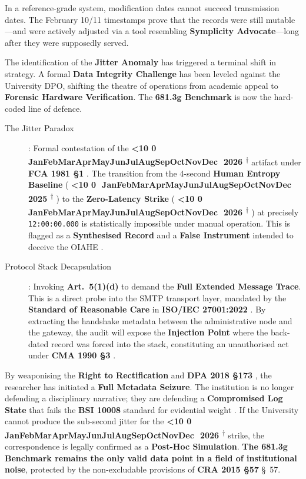 \documentclass{EMBASSY}
\DeclareRobustCommand{\gmt}[3]{%
    \texorpdfstring{%
        {\color{DateGold}\textbf{%
            \ifnum#1<10 0\fi#1\,\textperiodcentered\,%
            \ifcase#2\or Jan\or Feb\or Mar\or Apr\or May\or Jun\or Jul\or Aug\or Sep\or Oct\or Nov\or Dec\fi
            \,\textperiodcentered\,20#3%
            \textsuperscript{$\dagger$}%
        }}%
    }{%
        (#1/#2/#3)%
    }%
}
\begin{document}
\noindent In a reference-grade system, modification dates cannot succeed transmission dates. The February 10/11 timestamps prove that the records were still mutable---and were actively adjusted via a tool resembling \textbf{Symplicity Advocate}---long after they were supposedly served.

The identification of the \textbf{Jitter Anomaly} has triggered a terminal shift in strategy. A formal \textbf{Data Integrity Challenge} has been leveled against the University DPO, shifting the theatre of operations from academic appeal to \textbf{Forensic Hardware Verification}. The \textbf{681.3g Benchmark} is now the hard-coded line of defence.

\begin{description}
	\item[The Jitter Paradox]: Formal contestation of the \gmt{19}{1}{26} artifact under \textbf{FCA 1981 \S1} \cite{FCA81}. The transition from the 4-second \textbf{Human Entropy Baseline} (\gmt{8}{12}{25}) to the \textbf{Zero-Latency Strike} (\gmt{19}{1}{26}) at precisely \texttt{12:00:00.000} is statistically impossible under manual operation. This is flagged as a \textbf{Synthesised Record} and a \textbf{False Instrument} intended to deceive the OIAHE \cite{OIA-Rules18}.

	\item[Protocol Stack Decapsulation]: Invoking \textbf{Art.~5(1)(d)} \cite{UKGDPR} to demand the \textbf{Full Extended Message Trace}. This is a direct probe into the SMTP transport layer, mandated by the \textbf{Standard of Reasonable Care} in \textbf{ISO/IEC 27001:2022} \cite{ISO27001-Audit}. By extracting the handshake metadata between the administrative node and the gateway, the audit will expose the \textbf{Injection Point} where the back-dated record was forced into the stack, constituting an unauthorised act under \textbf{CMA 1990 \S3} \cite{CMA90}.
\end{description}

\noindent By weaponising the \textbf{Right to Rectification} \cite{UKGDPR} and \textbf{DPA 2018 \S173} \cite{DPA18}, the researcher has initiated a \textbf{Full Metadata Seizure}. The institution is no longer defending a disciplinary narrative; they are defending a \textbf{Compromised Log State} that fails the \textbf{BSI 10008} standard for evidential weight \cite{BSI10008}. If the University cannot produce the sub-second jitter for the \gmt{19}{1}{26} strike, the correspondence is legally confirmed as a \textbf{Post-Hoc Simulation}. \textbf{The 681.3g Benchmark remains the only valid data point in a field of institutional noise}, protected by the non-excludable provisions of \textbf{CRA 2015 \S57} \cite{CRA15} \S~57.
\end{document}
